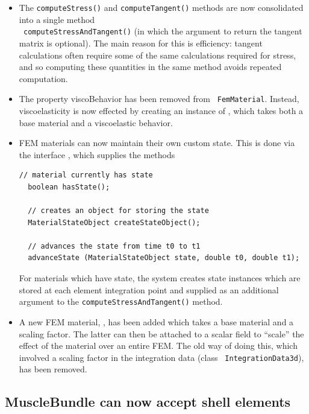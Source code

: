 \documentclass{article}
\begin{document}
\begin{itemize}

\item The {\tt computeStress()} and {\tt computeTangent()} methods are
now consolidated into a single method \\ {\tt
computeStressAndTangent()} (in which the argument to return the
tangent matrix is optional). The main reason for this is efficiency:
tangent calculations often require some of the same calculations
required for stress, and so computing these quantities in the same
method avoids repeated computation.

\item The property {\sf viscoBehavior} has been removed from {\tt
FemMaterial}. Instead, viscoelasticity is now effected by creating an
instance of
, which
takes both a base material and a viscoelastic behavior.

\item FEM materials can now maintain their own
custom state. This is done via the interface 
,
which supplies the methods
%
\begin{lstlisting}[]
  // material currently has state
  boolean hasState(); 

  // creates an object for storing the state
  MaterialStateObject createStateObject();

  // advances the state from time t0 to t1
  advanceState (MaterialStateObject state, double t0, double t1);
\end{lstlisting}
%
For materials which have state, the system creates state instances
which are stored at each element integration point and supplied as an
additional argument to the {\tt computeStressAndTangent()} method.

\item A new FEM material,
, has been added
which takes a base material and a scaling factor. The latter can then be
attached to a scalar field to ``scale'' the effect of the material
over an entire FEM. The old way of doing this, which involved a
scaling factor in the integration data (class {\tt
IntegrationData3d}), has been removed.

\end{itemize}

\subsection*{MuscleBundle can now accept shell elements}
\end{document}
